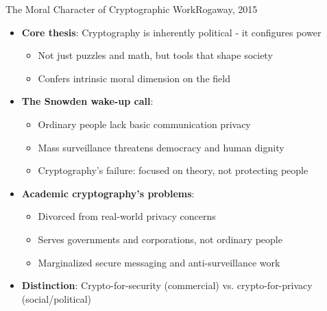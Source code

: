 \documentclass[aspectratio=169, lualatex, handout]{beamer}
\begin{document}
\begin{frame}{The Moral Character of Cryptographic Work}{Rogaway, 2015}
	\begin{itemize}[<+->]
		\item \textbf{Core thesis}: Cryptography is inherently political - it configures power
		      \begin{itemize}
			      \item Not just puzzles and math, but tools that shape society
			      \item Confers intrinsic moral dimension on the field
		      \end{itemize}
		\item \textbf{The Snowden wake-up call}:
		      \begin{itemize}
			      \item Ordinary people lack basic communication privacy
			      \item Mass surveillance threatens democracy and human dignity
			      \item Cryptography's failure: focused on theory, not protecting people
		      \end{itemize}
		\item \textbf{Academic cryptography's problems}:
		      \begin{itemize}
			      \item Divorced from real-world privacy concerns
			      \item Serves governments and corporations, not ordinary people
			      \item Marginalized secure messaging and anti-surveillance work
		      \end{itemize}
		\item \textbf{Distinction}: Crypto-for-security (commercial) vs. crypto-for-privacy (social/political)
	\end{itemize}
\end{frame}
\end{document}
